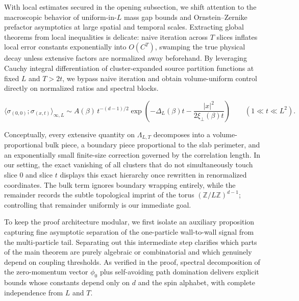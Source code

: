 \documentclass[11pt]{article}
\theoremstyle{definition}
\begin{document}
With local estimates secured in the opening subsection, we shift attention to the
macroscopic behavior of uniform-in-$L$ mass gap bounds and Ornstein--Zernike
prefactor asymptotics at large spatial and temporal scales. Extracting global
theorems from local inequalities is delicate: naive iteration across $T$ slices
inflates local error constants exponentially into $O(C^T)$, swamping the true
physical decay unless extensive factors are normalized away beforehand. By
leveraging Cauchy integral differentiation of cluster-expanded source partition
functions at fixed $L$ and $T > 2t$, we bypass naive iteration and obtain
volume-uniform control directly on normalized ratios and spectral blocks.

\[
  \langle \sigma_{(0,0)} ; \sigma_{(x,t)} \rangle_{\infty, L} \sim A(\beta) \, t^{-(d-1)/2} \exp\!\left(-\Delta_L(\beta) t - \frac{|x|^2}{2 \xi_\perp(\beta) t}\right) \qquad (1 \ll t \ll L^2).
\]

Conceptually, every extensive quantity on $\Lambda_{L,T}$ decomposes into a
volume-proportional bulk piece, a boundary piece proportional to the slab perimeter,
and an exponentially small finite-size correction governed by the correlation
length. In our setting, the exact vanishing of all clusters that do not
simultaneously touch slice $0$ and slice $t$ displays this exact hierarchy once
rewritten in renormalized coordinates. The bulk term ignores boundary wrapping
entirely, while the remainder records the subtle topological imprint of the torus
$(\mathbb{Z}/L\mathbb{Z})^{d-1}$; controlling that remainder uniformly is our
immediate goal.

To keep the proof architecture modular, we first isolate an auxiliary proposition
capturing fine asymptotic separation of the one-particle wall-to-wall signal from
the multi-particle tail. Separating out this intermediate step clarifies which parts
of the main theorem are purely algebraic or combinatorial and which genuinely depend
on coupling thresholds. As verified in the proof, spectral decomposition of the
zero-momentum vector $\phi_0$ plus self-avoiding path domination delivers explicit
bounds whose constants depend only on $d$ and the spin alphabet, with complete
independence from $L$ and $T$.
\end{document}
